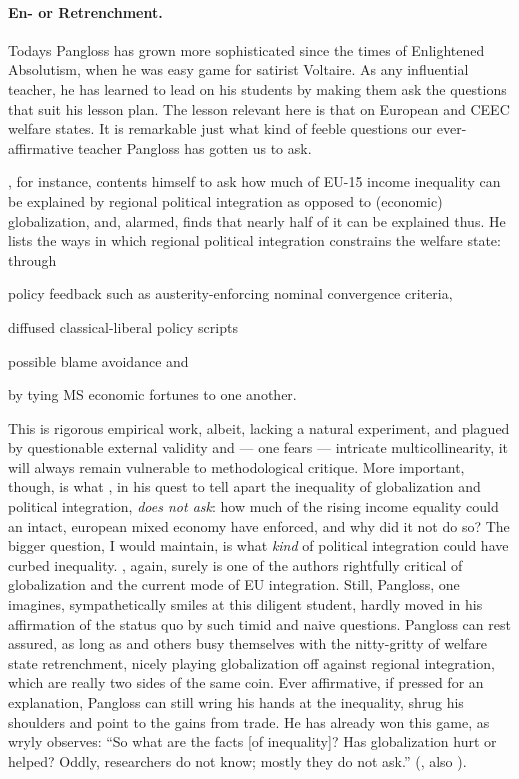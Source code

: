 \documentclass[11pt,a4paper,oneside,openright]{article}
\begin{document}
\paragraph{En- or Retrenchment.} Todays Pangloss has grown more sophisticated since the times of Enlightened Absolutism, when he was easy game for satirist Voltaire. 
As any influential teacher, he has learned to lead on his students by making them ask the questions that suit his lesson plan. 
The lesson relevant here is that on European and \gls{CEEC} welfare states. 
It is remarkable just what kind of feeble questions our ever-affirmative teacher Pangloss has gotten us to ask.

\cite{Beckfield2006}, for instance, contents himself to ask how much of \gls{EU}-15 income inequality can be explained by regional political integration as opposed to (economic) globalization, and, alarmed, finds that nearly half of it can be explained thus. 
He lists the ways in which  regional political integration constrains the welfare state: 
through \begin{inparaenum} 
	\item policy feedback such as austerity-enforcing nominal convergence criteria, 
	\item diffused classical-liberal policy scripts
	\item possible blame avoidance and
	\item by tying \gls{MS} economic fortunes to one another.
\end{inparaenum} This is rigorous empirical work, albeit, lacking a natural experiment, and plagued by questionable external validity and --- one fears --- intricate multicollinearity, it will always remain vulnerable to methodological critique. 
More important, though, is what \citeauthor{Beckfield2006}, in his quest to tell apart the inequality of globalization and political integration, \emph{does not ask}: 
how much of the rising income equality could an intact, european mixed economy have enforced, and why did it not do so? 
The bigger question, I would maintain, is what \emph{kind} of political integration could have curbed inequality. 
\citeauthor{Beckfield2006}, again, surely is one of the authors rightfully critical of globalization and the current mode of \gls{EU} integration. 
Still, Pangloss, one imagines, sympathetically smiles at this diligent student, hardly moved in his affirmation of the status quo by such timid and naive questions. 
Pangloss can rest assured, as long as \citeauthor{Beckfield2006} and others busy themselves with the nitty-gritty of welfare state retrenchment, nicely playing globalization off against regional integration, which are really two sides of the same coin. 
Ever affirmative, if pressed for an explanation, Pangloss can still wring his hands at the inequality, shrug his shoulders and point to the gains from trade. 
He has already won this game, as \citeauthor{Galbraith2002a} wryly observes: 
``So what are the facts [of inequality]? 
Has globalization hurt or helped? 
Oddly, researchers do not know; mostly they do not ask.'' (\citeyear[11]{Galbraith2002a}, also \citealt[158]{Crouch2004}).
\end{document}
